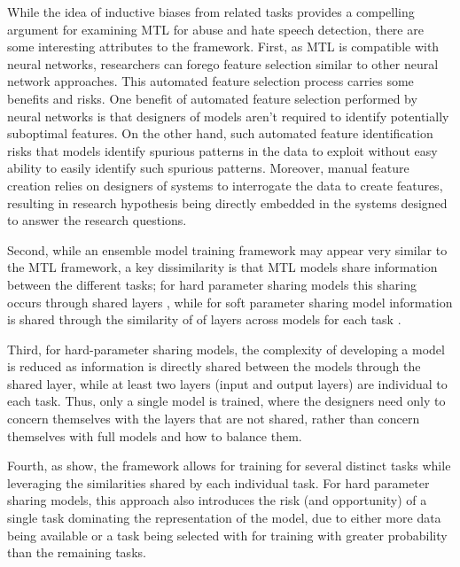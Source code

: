 While the idea of inductive biases from related tasks provides a compelling argument for examining MTL for abuse and hate speech detection, there are some interesting attributes to the framework.
First, as MTL is compatible with neural networks, researchers can forego feature selection similar to other neural network approaches. This automated feature selection process carries some benefits and risks.
One benefit of automated feature selection performed by neural networks is that designers of models aren't required to identify potentially suboptimal features. 
On the other hand, such automated feature identification risks that models identify spurious patterns in the data to exploit without easy ability to easily identify such spurious patterns.
Moreover, manual feature creation relies on designers of systems to interrogate the data to create features, resulting in research hypothesis being directly embedded in the systems designed to answer the research questions.

Second, while an ensemble model training framework may appear very similar to the MTL framework, a key dissimilarity is that MTL models share information between the different tasks; for hard parameter sharing models this sharing occurs through shared layers \citep{Caruana:1993}, while for soft parameter sharing model information is shared through the similarity of of layers across models for each task \citep{Duong:2015}.

Third, for hard-parameter sharing models, the complexity of developing a model is reduced as information is directly shared between the models through the shared layer, while at least two layers (input and output layers) are individual to each task.
Thus, only a single model is trained, where the designers need only to concern themselves with the layers that are not shared, rather than concern themselves with full models and how to balance them.

Fourth, as \cite{Caruana:1997} show, the framework allows for training for several distinct tasks while leveraging the similarities shared by each individual task.
For hard parameter sharing models, this approach also introduces the risk (and opportunity) of a single task dominating the representation of the model, due to either more data being available or a task being selected with for training with greater probability than the remaining tasks.

